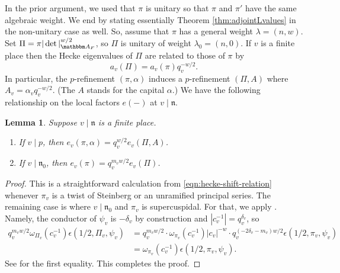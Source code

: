 \documentclass[10pt, twoside]{amsart}
\theoremstyle{plain}
\newtheorem{lemma}[theorem]{Lemma}
\theoremstyle{definition}
\theoremstyle{remark}
\numberwithin{equation}{subsection}
\def\A{\mathbbm A}
\def\gn{\mathfrak n}
\begin{document}
In the prior argument, we used that $\pi$ is unitary so that $\pi$ and $\pi'$ have the same algebraic weight. We end by stating essentially Theorem \ref{thm:adjointLvalues} in the non-unitary case as well. So, assume that $\pi$ has a general weight $\lambda = (n,w)$. Set $\Pi = \pi|\det|_{\A_F}^{w/2}$, so $\Pi$ is unitary of weight $\lambda_0 = (n,0)$. If $v$ is a finite place then the Hecke eigenvalues of $\Pi$ are related to those of $\pi$ by
\begin{equation}\label{eqn:hecke-shift-relation}
a_v(\Pi) = a_v(\pi)q_v^{-w/2}.
\end{equation}
In particular, the $p$-refinement $(\pi,\alpha)$ induces a $p$-refinement $(\Pi,A)$ where $A_v = \alpha_v q_v^{-w/2}$. (The $A$ stands for the capital $\alpha$.) We have the following relationship on the local factors $e(-)$ at $v \mid \gn$.

\begin{lemma}\label{lemma:change-twist}
Suppose $v \mid \gn$ is a finite place.
\begin{enumerate}
\item If $v \mid p$, then $e_v(\pi,\alpha) = q_v^{w/2}e_v(\Pi,A)$.
\item If $v \mid \gn_0$, then $e_v(\pi) = q_v^{m_vw/2} e_v(\Pi)$.
\end{enumerate}
\end{lemma}
\begin{proof}
This is a straightforward calculation from \eqref{eqn:hecke-shift-relation} whenever $\pi_v$ is a twist of Steinberg or an unramified principal series. The remaining case is where $v \mid \gn_0$ and $\pi_v$ is supercuspidal. For that, we apply \cite[Eq.\ (10)]{Schmidt}. Namely, the conductor of $\psi_v$ is $-\delta_v$ by construction and $|c_v^{-1}| = q_v^{\delta_v}$, so
\begin{align*}
q_v^{m_vw/2}\omega_{\Pi_v}(c_v^{-1})\epsilon(1/2,\Pi_v,\psi_v)
&= q_v^{m_vw/2}\cdot \omega_{\pi_v}(c_v^{-1})|c_v|^{-w}\cdot q_v^{(-2\delta_v - m_v)w/2}\epsilon(1/2,\pi_v,\psi_v)\\
&= \omega_{\pi_v}(c_v^{-1})\epsilon(1/2,\pi_v,\psi_v).
\end{align*}
See \cite[Eq.\ (10)]{Schmidt} for the first equality. This completes the proof.
\end{proof}
\end{document}
